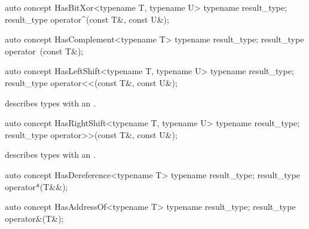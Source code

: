 \documentclass[american,twoside]{book}
\begin{document}
\begin{itemdecl}
auto concept HasBitXor<typename T, typename U> {
  typename result_type;
  result_type operator^(const T&, const U&);
}
\end{itemdecl}

\begin{itemdescr}
\pnum
{}
\end{itemdescr}

\begin{itemdecl}
auto concept HasComplement<typename T> {
  typename result_type;
  result_type operator~(const T&);
}
\end{itemdecl}

\begin{itemdescr}
\pnum
{}
\end{itemdescr}

\begin{itemdecl}
auto concept HasLeftShift<typename T, typename U> {
  typename result_type;
  result_type operator<<(const T&, const U&);
}
\end{itemdecl}

\begin{itemdescr}
\pnum
\mbox{\reallynote} describes types with an \mbox{}.
\end{itemdescr}

\begin{itemdecl}
auto concept HasRightShift<typename T, typename U> {
  typename result_type;
  result_type operator>>(const T&, const U&);
}
\end{itemdecl}

\begin{itemdescr}
\pnum
\mbox{\reallynote} describes types with an \mbox{}.
\end{itemdescr}

\begin{itemdecl}
auto concept HasDereference<typename T> {
  typename result_type;
  result_type operator*(T&&);
}
\end{itemdecl}

\begin{itemdescr}
\pnum
{}
\end{itemdescr}

\begin{itemdecl}
auto concept HasAddressOf<typename T> {
  typename result_type;
  result_type operator&(T&);
}
\end{itemdecl}
\end{document}
